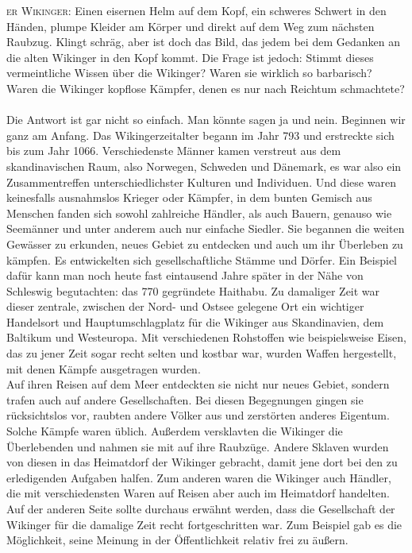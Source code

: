 \documentclass[12pt,a4paper,ngerman,openany]{book}
\newcommand{\flettrine}[2]{\lettrine[lines=2, depth=0, loversize=0.25, nindent=0.69pt, lraise=0.15]{\initfamily{#1}}{#2}}
\newcommand*\initfamily{\usefont{U}{GotIn}{xl}{n}}
\begin{document}
\flettrine{D}{er Wikinger:} Einen eisernen Helm auf dem Kopf, ein schweres Schwert in den Händen, plumpe Kleider am Körper und direkt auf dem Weg zum nächsten Raubzug.
Klingt schräg, aber ist doch das Bild, das jedem bei dem Gedanken an die alten Wikinger in den Kopf kommt. Die Frage ist jedoch: Stimmt dieses vermeintliche Wissen über die Wikinger?
Waren sie wirklich so barbarisch? Waren die Wikinger kopflose Kämpfer, denen es nur nach Reichtum schmachtete?\\\\
Die Antwort ist gar nicht so einfach. Man könnte sagen ja und nein. Beginnen wir ganz am Anfang. Das Wikingerzeitalter begann im Jahr 793 und erstreckte sich bis zum Jahr 1066.
Verschiedenste Männer kamen verstreut aus dem skandinavischen Raum, also Norwegen, Schweden und Dänemark, es war also ein Zusammentreffen unterschiedlichster Kulturen und Individuen.
Und diese waren keinesfalls ausnahmslos Krieger oder Kämpfer, in dem bunten Gemisch aus Menschen fanden sich sowohl zahlreiche Händler, als auch Bauern, genauso wie Seemänner und unter anderem auch nur einfache Siedler.
Sie begannen die weiten Gewässer zu erkunden, neues Gebiet zu entdecken und auch um ihr Überleben zu kämpfen. Es entwickelten sich gesellschaftliche Stämme und Dörfer.
Ein Beispiel dafür kann man noch heute fast eintausend Jahre später in der Nähe von Schleswig begutachten: das 770 gegründete Haithabu. Zu damaliger Zeit war dieser zentrale,
zwischen der Nord- und Ostsee gelegene Ort ein wichtiger Handelsort und Hauptumschlagplatz für die Wikinger aus Skandinavien, dem Baltikum und Westeuropa. Mit verschiedenen Rohstoffen wie beispielsweise Eisen,
das zu jener Zeit sogar recht selten und kostbar war, wurden Waffen hergestellt, mit denen Kämpfe ausgetragen wurden.\\
Auf ihren Reisen auf dem Meer entdeckten sie nicht nur neues Gebiet, sondern trafen auch auf andere Gesellschaften. Bei diesen Begegnungen gingen sie rücksichtslos vor, raubten andere Völker aus und zerstörten anderes Eigentum.
Solche Kämpfe waren üblich. Außerdem versklavten die Wikinger die Überlebenden und nahmen sie mit auf ihre Raubzüge. Andere Sklaven wurden von diesen in das Heimatdorf der Wikinger gebracht, damit jene dort bei den zu erledigenden Aufgaben halfen.
Zum anderen waren die Wikinger auch Händler, die mit verschiedensten Waren auf Reisen aber auch im Heimatdorf handelten.\\
Auf der anderen Seite sollte durchaus erwähnt werden, dass die Gesellschaft der Wikinger für die damalige Zeit recht fortgeschritten war. Zum Beispiel gab es die Möglichkeit, seine Meinung in der Öffentlichkeit relativ frei zu äußern.
\end{document}
